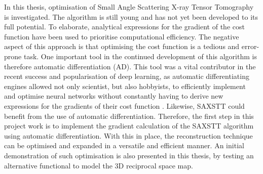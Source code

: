 In this thesis, optimisation of Small Angle Scattering X-ray Tensor Tomography is investigated.
The algorithm is still young and has not yet been developed to its full potential.
To elaborate, analytical expressions for the gradient of the cost function have been used to prioritise computational efficiency.
The negative aspect of this approach is that optimising the cost function is a tedious and error-prone task.
One important tool in the continued development of this algorithm is therefore automatic differentiation (AD).
This tool was a vital contributor in the recent success and popularisation of deep learning,
as automatic differentiating engines allowed not only scientist, but also hobbyists, to efficiently implement and optimise neural networks without constantly
having to derive new expressions for the gradients of their cost function \cite{baydin2018automatic}. Likewise, SAXSTT could benefit from the use of automatic differentiation.
Therefore, the first step in this project work is to implement the gradient calculation of the SAXSTT algorithm using automatic differentiation.
With this in place, the reconstruction technique can be optimised and expanded in a versatile and efficient manner.
An initial demonstration of such optimisation is also presented in this thesis, by testing an alternative functional to model the 3D reciprocal space map.
